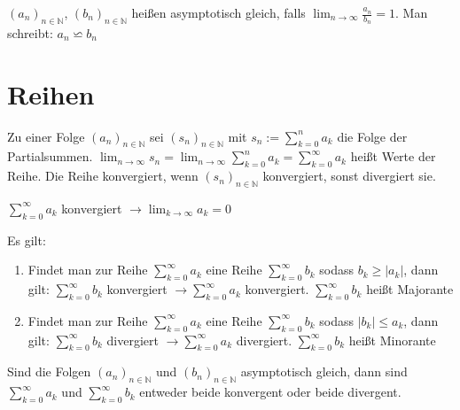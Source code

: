 \documentclass[]{article}
\begin{document}
\begin{definition}
	 $(a_n)_{n \in \mathbb{N}}$,  $(b_n)_{n \in \mathbb{N}}$ heißen asymptotisch gleich, falls $\lim_{n \rightarrow \infty} \frac{a_n}{b_n} = 1$. Man schreibt: $a_n \backsimeq b_n$
\end{definition}

\section{Reihen}


\begin{definition}
	Zu einer Folge $(a_n)_{n \in \mathbb{N}}$ sei $(s_n)_{n \in \mathbb{N}}$ mit $s_n := \sum_{k=0}^{n} a_k$ die Folge der Partialsummen. $\lim_{n \rightarrow \infty} s_n = \lim_{n \rightarrow \infty} \sum_{k=0}^{n} a_k = \sum_{k=0}^{\infty} a_k$ heißt Werte der Reihe. Die Reihe konvergiert, wenn $(s_n)_{n \in \mathbb{N}}$ konvergiert, sonst divergiert sie.
\end{definition}

\begin{satz}[Konvergenzkriterium]
	 $\sum_{k=0}^{\infty} a_k $ konvergiert $\rightarrow \lim_{k \rightarrow \infty} a_k = 0$
\end{satz}

\begin{satz}[Majorantenkriterium]
	Es gilt:
	\begin{enumerate}[noitemsep]
		\item Findet man zur Reihe	$\sum_{k=0}^{\infty} a_k $ eine Reihe $\sum_{k=0}^{\infty} b_k $ sodass $b_k \geq |a_k|$, dann gilt: $\sum_{k=0}^{\infty} b_k$ konvergiert $\rightarrow \sum_{k=0}^{\infty} a_k $ konvergiert. $\sum_{k=0}^{\infty} b_k $ heißt Majorante
		\item Findet man zur Reihe	$\sum_{k=0}^{\infty} a_k $ eine Reihe $\sum_{k=0}^{\infty} b_k $ sodass $|b_k| \leq a_k$, dann gilt: $\sum_{k=0}^{\infty} b_k$ divergiert $\rightarrow \sum_{k=0}^{\infty} a_k $ divergiert. $\sum_{k=0}^{\infty} b_k $ heißt Minorante	
	\end{enumerate}
\end{satz}

\begin{satz}[Konvergenzkriterium]
	Sind die Folgen $(a_n)_{n \in \mathbb{N}}$ und $(b_n)_{n \in \mathbb{N}}$ asymptotisch gleich, dann sind $\sum_{k=0}^{\infty} a_k$ und $\sum_{k=0}^{\infty} b_k$ entweder beide konvergent oder beide divergent.
\end{satz}
\end{document}
